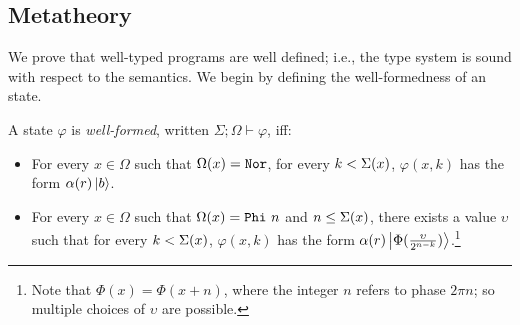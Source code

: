 
\subsection{\oqasm Metatheory}\label{sec:metatheory}

We prove that well-typed \oqasm programs are well defined; i.e., the
type system is sound with respect to the semantics. 
We begin by defining the well-formedness of an \oqasm state.

\begin{definition}\label{def:well-formed}\rm 
  A state $\varphi$ is \emph{well-formed}, written
  $\Sigma;\Omega \vdash \varphi$, iff:
\begin{itemize}
\item For every $x \in \Omega$ such that $\Omega(x) = \texttt{Nor}$,
  for every $k <\Sigma(x)$, $\varphi(x,k)$ has the form
  $\alpha(r)\left\vert{b}\right\rangle$.

\item For every $x \in \Omega$ such that $\Omega(x) = \texttt{Phi}~{n}$ and $n \le \Sigma(x)$,
  there exists a value $\upsilon$ such that for
  every $k < \Sigma(x)$, $\varphi(x,k)$ has the form
  $\alpha(r)\left\vert{\Phi(\frac{\upsilon}{ 2^{n- k}})}\right\rangle$.\footnote{Note that $\Phi(x) = \Phi(x + n)$, where the integer $n$ refers to phase $2 \pi n$; so multiple choices of $\upsilon$ are possible.}
\end{itemize}
\end{definition}

